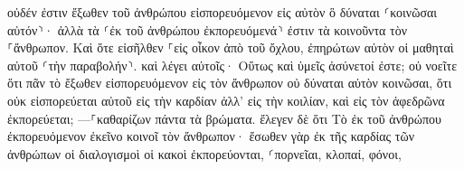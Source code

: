 \documentclass{openreader}
\begin{document}
οὐδέν ἐστιν ἔξωθεν τοῦ ἀνθρώπου εἰσπορευόμενον εἰς αὐτὸν ὃ δύναται ⸂κοινῶσαι αὐτόν⸃· ἀλλὰ τὰ ⸂ἐκ τοῦ ἀνθρώπου ἐκπορευόμενά⸃ ἐστιν τὰ κοινοῦντα τὸν ⸀ἄνθρωπον. 
Καὶ ὅτε εἰσῆλθεν ⸀εἰς οἶκον ἀπὸ τοῦ ὄχλου, ἐπηρώτων αὐτὸν οἱ μαθηταὶ αὐτοῦ ⸂τὴν παραβολήν⸃. 
καὶ λέγει αὐτοῖς· Οὕτως καὶ ὑμεῖς ἀσύνετοί ἐστε; οὐ νοεῖτε ὅτι πᾶν τὸ ἔξωθεν εἰσπορευόμενον εἰς τὸν ἄνθρωπον οὐ δύναται αὐτὸν κοινῶσαι, 
ὅτι οὐκ εἰσπορεύεται αὐτοῦ εἰς τὴν καρδίαν ἀλλ’ εἰς τὴν κοιλίαν, καὶ εἰς τὸν ἀφεδρῶνα ἐκπορεύεται; —⸀καθαρίζων πάντα τὰ βρώματα. 
ἔλεγεν δὲ ὅτι Τὸ ἐκ τοῦ ἀνθρώπου ἐκπορευόμενον ἐκεῖνο κοινοῖ τὸν ἄνθρωπον· 
ἔσωθεν γὰρ ἐκ τῆς καρδίας τῶν ἀνθρώπων οἱ διαλογισμοὶ οἱ κακοὶ ἐκπορεύονται, ⸂πορνεῖαι, κλοπαί, φόνοι, 
\end{document}
